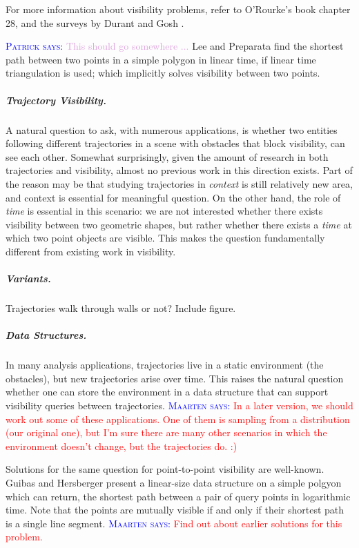\documentclass[a4paper, UKenglish]{paper}
\newcommand{\myremark}[4]{\textcolor{blue}{\textsc{#1 #2:}} \textcolor{#4}{\textsf{#3}}}
\newcommand{\patrick}[2][says]{\myremark{Patrick}{#1}{#2}{Plum}}
\newcommand{\maarten}[2][says]{\myremark{Maarten}{#1}{#2}{Red}}
\begin{document}
For more information about visibility problems, refer to O'Rourke's book \cite{ORourke87} chapter 28, and the surveys by Durant \cite{durand2000multidisciplinary} and Gosh  \cite{Ghosh:2013:UPV:2543581.2543589}. 

\patrick{This should go somewhere ...} Lee and Preparata \cite{LeeP84} find the shortest path between two points in a simple polygon in linear time, if linear time triangulation is used; which implicitly solves visibility between two points.

\subparagraph {Trajectory Visibility.}

A natural question to ask, with numerous applications, is whether two entities following different trajectories in a scene with obstacles that block visibility, can see each other.
Somewhat surprisingly, given the amount of research in both trajectories and visibility, almost no previous work in this direction exists.
Part of the reason may be that studying trajectories in {\em context} is still relatively new area, and context is essential for meaningful question.
On the other hand, the role of {\em time} is essential in this scenario: we are not interested whether there exists visibility between two geometric shapes, but rather whether there exists a {\em time} at which two point objects are visible. This makes the question fundamentally different from existing work in visibility.

\subparagraph {Variants.}

Trajectories walk through walls or not?
Include figure.



\subparagraph {Data Structures.}

In many analysis applications, trajectories live in a static environment (the obstacles), but new trajectories arise over time. This raises the natural question whether one can store the environment in a data structure that can support visibility queries between trajectories.
\maarten {In a later version, we should work out some of these applications. One of them is sampling from a distribution (our original one), but I'm sure there are many other scenarios in which the environment doesn't change, but the trajectories do. :)}

Solutions for the same question for point-to-point visibility are well-known.
Guibas and Hersberger \cite{GUIBAS1989126} present a linear-size data structure on a simple polgyon which can return, the shortest path between a pair of query points in logarithmic time. Note that the points are mutually visible if and only if their shortest path is a single line segment. \maarten {Find out about earlier solutions for this problem.}
\end{document}
